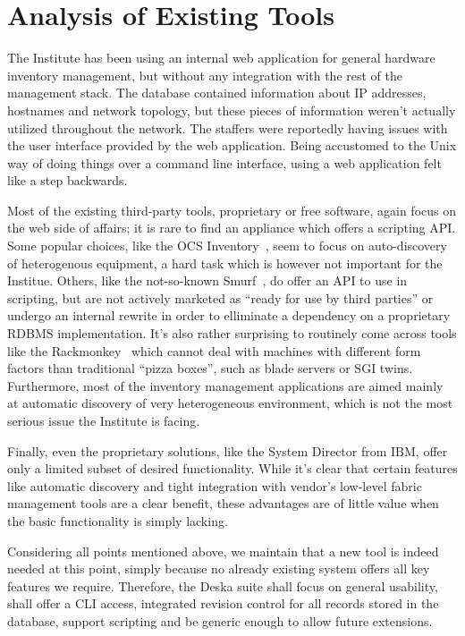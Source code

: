 \documentclass[a4paper]{jpconf}
\begin{document}
\section{Analysis of Existing Tools}

The Institute has been using an internal web application for general hardware inventory management, but without any integration with
the rest of the management stack.  The database contained information about IP addresses, hostnames and network topology, but these
pieces of information weren't actually utilized throughout the network.  The staffers were reportedly having issues with the user
interface provided by the web application.  Being accustomed to the Unix way of doing things over a command line interface, using a web
application felt like a step backwards.

Most of the existing third-party tools, proprietary or free software, again focus on the web side of affairs; it is rare to find an
appliance which offers a scripting API.  Some popular choices, like the OCS Inventory~\cite{ocs-inventory}, seem to focus on
auto-discovery of heterogenous equipment, a hard task which is however not important for the Institue.  Others, like the not-so-known
Smurf~\cite{smurf}, do offer an API to use in scripting, but are not actively marketed as ``ready for use by third parties'' or undergo
an internal rewrite in order to elliminate a dependency on a proprietary RDBMS implementation.  It's also rather surprising to
routinely come across tools like the Rackmonkey~\cite{rackmonkey} which cannot deal with machines with different form factors than
traditional ``pizza boxes'', such as blade servers or SGI twins.  Furthermore, most of the inventory management applications are aimed
mainly at automatic discovery of very heterogeneous environment, which is not the most serious issue the Institute is facing.

Finally, even the proprietary solutions, like the System Director from IBM, offer only a limited subset of desired functionality.
While it's clear that certain features like automatic discovery and tight integration with vendor's low-level fabric management tools
are a clear benefit, these advantages are of little value when the basic functionality is simply lacking.

Considering all points mentioned above, we maintain that a new tool is indeed needed at this point, simply because no already existing
system offers all key features we require.  Therefore, the Deska suite shall focus on general usability, shall offer a CLI access,
integrated revision control for all records stored in the database, support scripting and be generic enough to allow future extensions.
\end{document}
